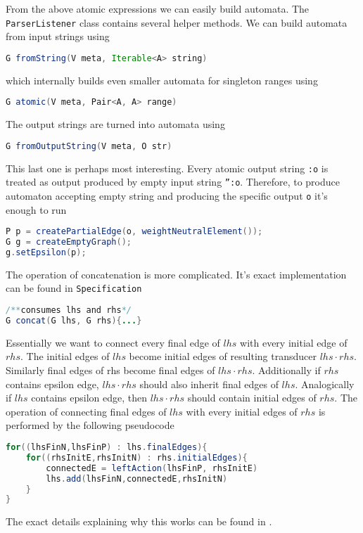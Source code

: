 \documentclass[12pt]{article}
\begin{document}
From the above atomic expressions we can easily build automata. The \texttt{ParserListener} class contains several helper methods. We can build automata from input strings using
\begin{lstlisting}[language=java]
G fromString(V meta, Iterable<A> string)
\end{lstlisting}
which internally builds even smaller automata for singleton ranges using
\begin{lstlisting}[language=java]
G atomic(V meta, Pair<A, A> range)
\end{lstlisting}
The output strings are turned into automata using
\begin{lstlisting}[language=java]
G fromOutputString(V meta, O str)
\end{lstlisting}
This last one is perhaps most interesting. Every atomic output string \texttt{:o} is treated as output produced by empty input string \texttt{'':o}. Therefore, to produce automaton accepting empty string and producing the specific output \texttt{o} it's enough to run
\begin{lstlisting}[language=java]
P p = createPartialEdge(o, weightNeutralElement());
G g = createEmptyGraph();
g.setEpsilon(p);
\end{lstlisting}
The operation of concatenation is more complicated.
It's exact implementation can be found in \texttt{Specification}
\begin{lstlisting}[language=java]
/**consumes lhs and rhs*/
G concat(G lhs, G rhs){...}
\end{lstlisting}
Essentially we want to connect every final edge of $lhs$ with every initial edge of $rhs$. The initial edges of $lhs$ become initial edges of resulting transducer $lhs \cdot rhs$. Similarly final edges of rhs become final edges of  $lhs \cdot rhs$. Additionally if $rhs$ contains epsilon edge,  $lhs \cdot rhs$ should also inherit final edges of $lhs$. Analogically if $lhs$ contains epsilon edge, then $lhs \cdot rhs$ should contain initial edges of $rhs$. The operation of connecting final edges of $lhs$ with every initial edges of $rhs$ is performed by the following pseudocode
\begin{lstlisting}[language=java]
for((lhsFinN,lhsFinP) : lhs.finalEdges){
    for((rhsInitE,rhsInitN) : rhs.initialEdges){
        connectedE = leftAction(lhsFinP, rhsInitE)
        lhs.add(lhsFinN,connectedE,rhsInitN)
    }
}
\end{lstlisting}
The exact details explaining why this works can be found in \cite{aleks2020glushkovs}.
\end{document}
